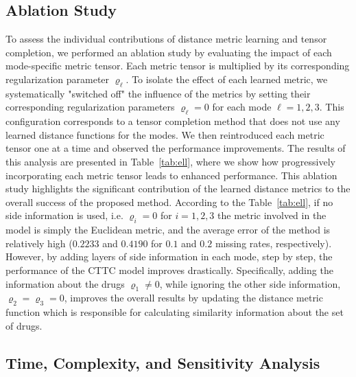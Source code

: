 \documentclass{article}
\begin{document}
\subsection{Ablation Study}
To assess the individual contributions of distance metric learning and tensor completion, we performed an ablation study by evaluating the impact of each mode-specific metric tensor. Each metric tensor is multiplied by its corresponding regularization parameter $\varrho_\ell$. To isolate the effect of each learned metric, we systematically "switched off" the influence of the metrics by setting their corresponding regularization parameters $\varrho_\ell = 0$ for each mode $\ell = 1, 2, 3$. This configuration corresponds to a tensor completion method that does not use any learned distance functions for the modes. We then reintroduced each metric tensor one at a time and observed the performance improvements. The results of this analysis are presented in Table~\ref{tab:ell}, where we show how progressively incorporating each metric tensor leads to enhanced performance. This ablation study highlights the significant contribution of the learned distance metrics to the overall success of the proposed method. According to the Table~\ref{tab:ell}, if no side information is used, i.e. $\varrho_i=0$ for $i=1,2,3$ the metric involved in the model is simply the Euclidean metric, and the average error of the method is relatively high ($0.2233$ and $0.4190$ for $0.1$ and $0.2$ missing rates, respectively). However, by adding layers of side information in each mode, step by step, the performance of the CTTC model improves drastically. Specifically, adding the information about the drugs $\varrho_1\neq0$, while ignoring the other side information, $\varrho_2=\varrho_3=0$, improves the overall results by updating the distance metric function which is responsible for calculating similarity information about the set of drugs.




\subsection{Time, Complexity, and Sensitivity Analysis}
\end{document}
